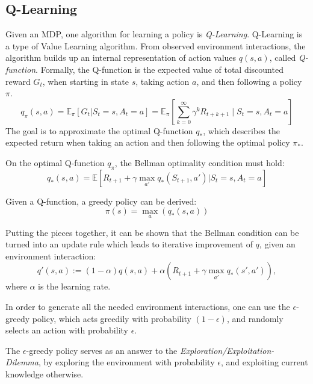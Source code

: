 \subsection{Q-Learning}
Given an MDP, one algorithm for learning a policy is \emph{Q-Learning}.
Q-Learning is a type of Value Learning algorithm.
From observed environment interactions, the algorithm builds up an internal representation of action values $q(s,a)$, called \emph{Q-function}.
Formally, the Q-function is the expected value of total discounted reward $G_t$, when starting in state $s$, taking action $a$, and then following a policy $\pi$.
\begin{equation} \label{eq:qfunction}
    q_\pi(s,a) = \mathbb{E}_\pi\left[G_t | S_t=s, A_t = a\right] = \mathbb{E}_\pi\left[\sum_{k=0}^{\infty}\gamma^kR_{t+k+1} \mid S_t = s, A_t = a\right]
\end{equation}
The goal is to approximate the optimal Q-function $q_*$, which describes the expected return when taking an action and then following the optimal policy $\pi_*$.

On the optimal Q-function $q_\pi$, the Bellman optimality condition must hold:
\begin{equation} \label{eq:bellman}
    q_*(s,a) = \mathbb{E}\left[R_{t+1} + \gamma \max_{a'}q_*(S_{t+1}, a') | S_t = s, A_t = a \right]
\end{equation}

Given a Q-function, a greedy policy can be derived:
\begin{equation} \label{eq:greedy}
    \pi(s) = \max_a(q_*(s,a))
\end{equation}

Putting the pieces together, it can be shown that the Bellman condition can be turned into an update rule which leads to iterative improvement of $q$, given an environment interaction:
\begin{equation} \label{eq:bellman_update}
    q'(s,a) := (1-\alpha) q(s,a) + \alpha \left(R_{t+1} + \gamma \max_{a'}q_*(s', a') \right),
\end{equation}
where $\alpha$ is the learning rate.

In order to generate all the needed environment interactions, one can use the $\epsilon$-greedy policy, which acts greedily with probability $(1-\epsilon)$, and randomly selects an action with probability $\epsilon$.

The $\epsilon$-greedy policy serves as an answer to the \emph{Exploration/Exploitation-Dilemma}, by exploring the environment with probability $\epsilon$, and exploiting current knowledge otherwise.

